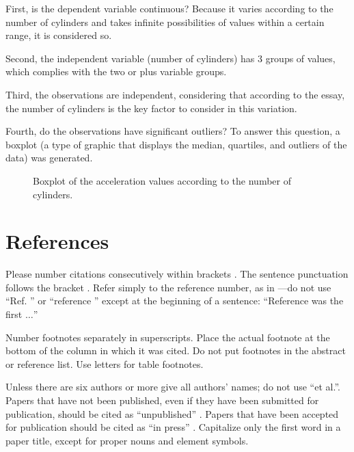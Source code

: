 \documentclass[conference]{IEEEtran}
\begin{document}
First, is the dependent variable continuous? Because it varies according to the number of cylinders and takes infinite possibilities of values within a certain range, it is considered so.

Second, the independent variable (number of cylinders) has 3 groups of values, which complies with the two or plus variable groups.

Third, the observations are independent, considering that according to the essay, the number of cylinders is the key factor to consider in this variation.

Fourth, do the observations have significant outliers? To answer this question, a boxplot (a type of graphic that displays the median, quartiles, and outliers of the data) was generated.


\begin{figure}[htbp]
\caption{Boxplot of the acceleration values according to the number of cylinders.}
\label{vehicle_boxplot}
\end{figure}

























\section*{References}

Please number citations consecutively within brackets \cite{b1}. The 
sentence punctuation follows the bracket \cite{b2}. Refer simply to the reference 
number, as in \cite{b3}---do not use ``Ref. \cite{b3}'' or ``reference \cite{b3}'' except at 
the beginning of a sentence: ``Reference \cite{b3} was the first $\ldots$''

Number footnotes separately in superscripts. Place the actual footnote at 
the bottom of the column in which it was cited. Do not put footnotes in the 
abstract or reference list. Use letters for table footnotes.

Unless there are six authors or more give all authors' names; do not use 
``et al.''. Papers that have not been published, even if they have been 
submitted for publication, should be cited as ``unpublished'' \cite{b4}. Papers 
that have been accepted for publication should be cited as ``in press'' \cite{b5}. 
Capitalize only the first word in a paper title, except for proper nouns and 
element symbols.
\end{document}
